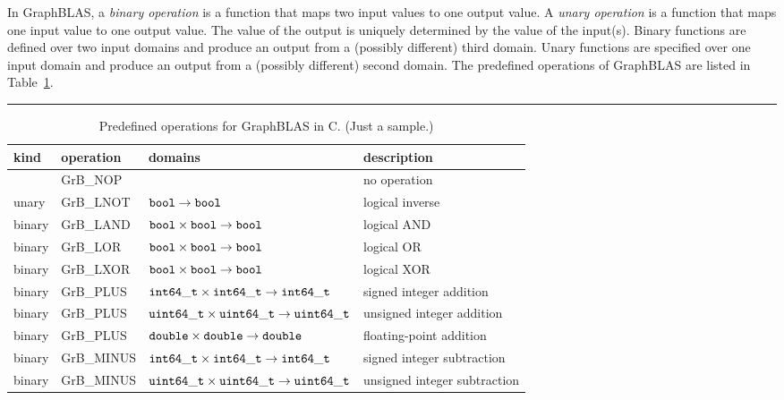 \documentclass[11pt]{extarticle}
\begin{document}
In GraphBLAS, a \emph{binary operation} is a function that maps two input
values to one output value. A \emph{unary operation} is a function that 
maps one input value to one output value. The value of the output is uniquely
determined by the value of the input(s).
Binary functions are defined over two input domains and produce an output from
a (possibly different) third domain. Unary functions are specified
over one input domain and produce an output from a (possibly different)
second domain.
The predefined operations of GraphBLAS are listed in
Table~\ref{Tab:PredefinedOperations}.

\begin{table}
\hrule
\begin{center}
\caption{Predefined operations for GraphBLAS in C. (Just a sample.)
}
\label{Tab:PredefinedOperations}
\begin{tabular}{l|l|l|l}
kind		& operation 		& domains								& description \\ \hline
		& {\sf GrB\_NOP}	& 									& no operation \\
unary		& {\sf GrB\_LNOT}	& ${\tt bool} \rightarrow {\tt bool}$      				& logical inverse \\
binary		& {\sf GrB\_LAND}	& ${\tt bool} \times {\tt bool} \rightarrow {\tt bool}$      		& logical AND \\
binary		& {\sf GrB\_LOR}	& ${\tt bool} \times {\tt bool} \rightarrow {\tt bool}$      		& logical OR \\
binary		& {\sf GrB\_LXOR}	& ${\tt bool} \times {\tt bool} \rightarrow {\tt bool}$      		& logical XOR \\
binary		& {\sf GrB\_PLUS}	& ${\tt int64\_t} \times {\tt int64\_t} \rightarrow {\tt int64\_t}$ 	& signed integer addition \\
binary		& {\sf GrB\_PLUS}	& ${\tt uint64\_t} \times {\tt uint64\_t} \rightarrow {\tt uint64\_t}$ 	& unsigned integer addition \\
binary		& {\sf GrB\_PLUS}	& ${\tt double} \times {\tt double} \rightarrow {\tt double}$ 		& floating-point addition \\
binary		& {\sf GrB\_MINUS}	& ${\tt int64\_t} \times {\tt int64\_t} \rightarrow {\tt int64\_t}$ 	& signed integer subtraction \\
binary		& {\sf GrB\_MINUS}	& ${\tt uint64\_t} \times {\tt uint64\_t} \rightarrow {\tt uint64\_t}$ 	& unsigned integer subtraction \\

\end{tabular}
\end{center}
\end{table}
\end{document}
